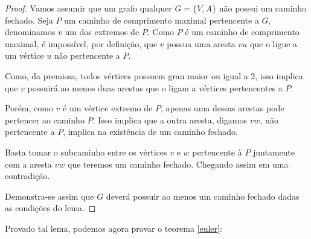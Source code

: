 \documentclass[12pt, a4paper]{article}
\begin{document}
\begin{proof}
	Vamos assumir que um grafo qualquer $G = \{V, A\}$ não possui um caminho fechado. 
	Seja $P$ um caminho de comprimento maximal pertencente a $G$, denominamos $v$ um dos extremos de $P$. 
	Como $P$ é um caminho de comprimento maximal, é impossível, por definição, que $v$ possua uma aresta $vu$ que o ligue a um vértice $u$ não pertencente a $P$.
	
	Como, da premissa, todos vértices possuem grau maior ou igual a 2, isso implica que $v$ possuirá ao menos duas arestas que o ligam a vértices pertencentes a $P$.

	Porém, como $v$ é um vértice extremo de $P$, apenas uma dessas arestas pode pertencer ao caminho $P$. Isso implica que a outra aresta, digamos $vw$, não pertencente a $P$, implica na existência de um caminho fechado.

	Basta tomar o subcaminho entre os vértices $v$ e $w$ pertencente à $P$ juntamente com a aresta $vw$ que teremos um caminho fechado. Chegando assim em uma contradição.

	Demonstra-se assim que $G$ deverá possuir ao menos um caminho fechado dadas as condições do lema.
\end{proof}

Provado tal lema, podemos agora provar o teorema \ref{euler}:
\end{document}
